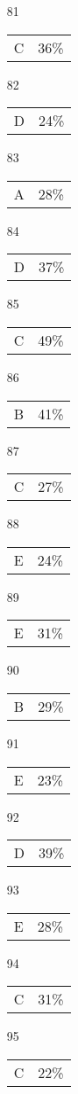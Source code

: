 \documentclass[12pt]{article}
\begin{document}
\begin{multicols}{5}
\begin{enumerate}
\item[81] \begin{tabular}{cc} C & 36\%\end{tabular}
\item[82] \begin{tabular}{cc} D & 24\%\end{tabular}
\item[83] \begin{tabular}{cc} A & 28\%\end{tabular}
\item[84] \begin{tabular}{cc} D & 37\%\end{tabular}
\item[85] \begin{tabular}{cc} C & 49\%\end{tabular}
\item[]
\item[86] \begin{tabular}{cc} B & 41\%\end{tabular}
\item[87] \begin{tabular}{cc} C & 27\%\end{tabular}
\item[88] \begin{tabular}{cc} E & 24\%\end{tabular}
\item[89] \begin{tabular}{cc} E & 31\%\end{tabular}
\item[90] \begin{tabular}{cc} B & 29\%\end{tabular}
\item[]
\item[91] \begin{tabular}{cc} E & 23\%\end{tabular}
\item[92] \begin{tabular}{cc} D & 39\%\end{tabular}
\item[93] \begin{tabular}{cc} E & 28\%\end{tabular}
\item[94] \begin{tabular}{cc} C & 31\%\end{tabular}
\item[95] \begin{tabular}{cc} C & 22\%\end{tabular}

\end{enumerate}
\end{multicols}
\end{document}
